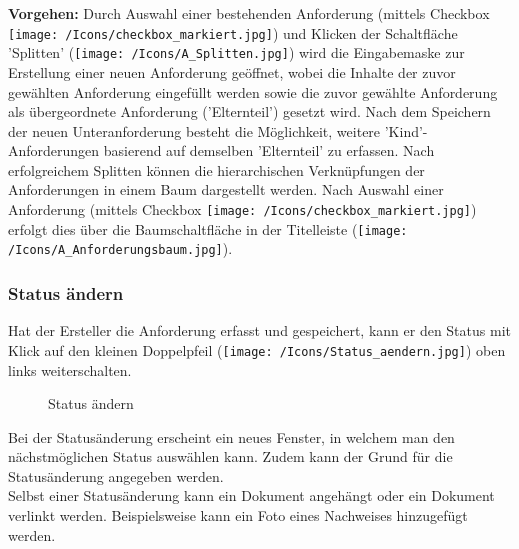 \textbf{Vorgehen:}
Durch Auswahl einer bestehenden Anforderung (mittels Checkbox \texttt{[image: /Icons/checkbox\_markiert.jpg]}) und Klicken der Schaltfläche 'Splitten'  (\texttt{[image: /Icons/A\_Splitten.jpg]}) wird die Eingabemaske zur Erstellung einer neuen Anforderung geöffnet, wobei die Inhalte der zuvor gewählten Anforderung eingefüllt werden sowie die zuvor gewählte Anforderung als übergeordnete Anforderung ('Elternteil') gesetzt wird. Nach dem Speichern der neuen Unteranforderung besteht die Möglichkeit, weitere 'Kind'-Anforderungen basierend auf demselben 'Elternteil' zu erfassen.
Nach erfolgreichem Splitten können die hierarchischen Verknüpfungen der Anforderungen in einem Baum dargestellt werden. Nach Auswahl einer Anforderung (mittels Checkbox \texttt{[image: /Icons/checkbox\_markiert.jpg]}) erfolgt dies über die Baumschaltfläche in der Titelleiste (\texttt{[image: /Icons/A\_Anforderungsbaum.jpg]}).

\clearpage
\subsubsection{Status ändern}

Hat der Ersteller die Anforderung erfasst und gespeichert, kann er den Status mit Klick auf den kleinen Doppelpfeil (\texttt{[image: /Icons/Status\_aendern.jpg]}) oben links weiterschalten. 

\begin{figure}[H]
\caption{Status ändern}
\end{figure}

Bei der Statusänderung erscheint ein neues Fenster, in welchem man den nächstmöglichen Status auswählen kann. Zudem kann der Grund für die Statusänderung angegeben werden. \\

Selbst einer Statusänderung kann ein Dokument angehängt  oder ein Dokument verlinkt  werden. Beispielsweise kann ein Foto eines Nachweises hinzugefügt werden. 

